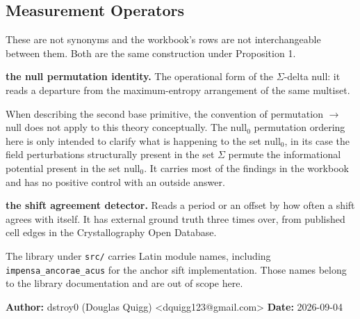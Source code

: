 \subsection{Measurement Operators}

\enlargethispage{4\baselineskip}

These are not synonyms and the workbook's rows are not interchangeable between them. Both are the same construction under Proposition 1.

\noindent\textbf{the null permutation identity.} The operational form of the \(\Sigma\)-delta null: it reads a departure from the maximum-entropy arrangement of the same multiset.

When describing the second base primitive, the convention of permutation \(\rightarrow\) null does not apply to this theory conceptually. The \(\text{null}_0\) permutation ordering here is only intended to clarify what is happening to the set \(\text{null}_0\), in its case the field perturbations structurally present in the set \(\Sigma\) permute the informational potential present in the set \(\text{null}_0\). It carries most of the findings in the workbook and has no positive control with an outside answer.

\noindent\textbf{the shift agreement detector.} Reads a period or an offset by how often a shift agrees with itself. It has external ground truth three times over, from published cell edges in the Crystallography Open Database.

The library under \texttt{src/\allowbreak{}} carries Latin module names, including \texttt{impensa\_\allowbreak{}ancorae\_\allowbreak{}acus} for the anchor sift implementation. Those names belong to the library documentation and are out of scope here.

\textbf{Author:} dstroy0 (Douglas Quigg) <dquigg123@gmail.com> \textbf{Date:} 2026-09-04
